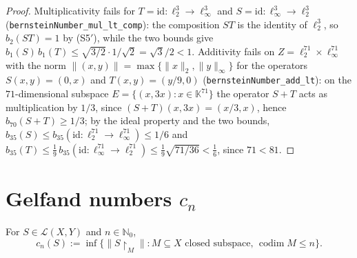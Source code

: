 \begin{proof}
Multiplicativity fails for $T = \mathrm{id} : \ell_2^3 \to \ell_\infty^3$
and $S = \mathrm{id} : \ell_\infty^3 \to \ell_2^3$
(\texttt{bernsteinNumber\_mul\_lt\_comp}): the composition $S T$ is
the identity of $\ell_2^3$, so $b_2(S T) = 1$ by (S5$'$), while the two
bounds give $b_1(S) \, b_1(T) \le \sqrt{3/2} \cdot 1/\sqrt{2} = \sqrt{3}/2
< 1$. Additivity fails on $Z = \ell_2^{71} \times \ell_\infty^{71}$ with the
norm $\|(x, y)\| = \max\{\|x\|_2, \|y\|_\infty\}$ for the operators
$S(x, y) = (0, x)$ and $T(x, y) = (y/9, 0)$
(\texttt{bernsteinNumber\_add\_lt}): on the $71$-dimensional
subspace $E = \{(x, 3x) : x \in \mathbb{K}^{71}\}$ the operator $S + T$
acts as multiplication by $1/3$, since $(S + T)(x, 3x) = (x/3, x)$, hence
$b_{70}(S + T) \ge 1/3$; by the ideal property and the two bounds,
$b_{35}(S) \le b_{35}(\mathrm{id} : \ell_2^{71} \to \ell_\infty^{71}) \le
1/6$ and $b_{35}(T) \le \tfrac19 \, b_{35}(\mathrm{id} : \ell_\infty^{71}
\to \ell_2^{71}) \le \tfrac19 \sqrt{71/36} < \tfrac16$, since $71 < 81$.
\end{proof}

\section{Gelfand numbers $c_n$}
\label{sec:gelf}

\begin{definition}
\label{def:gelfand-number}
\leanok
For $S \in \mathcal{L}(X, Y)$ and $n \in \mathbb{N}_0$,
\[
c_n(S) := \inf \bigl\{ \|S \restriction_M\| :
            M \subseteq X \text{ closed subspace, } \operatorname{codim} M \le n
            \bigr\}.
\]
\end{definition}

